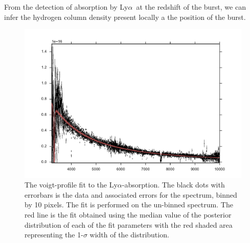 \documentclass[a4paper,fleqn,usenatbib]{mnras}
\newcommand{\lya}{Ly$\alpha$}
\begin{document}
From the detection of absorption by \lya~at the redshift of the burst,
we can infer the hydrogen column density present locally a the
position of the burst. 





\begin{figure} %
	\includegraphics[width=\columnwidth]{figures/DLA_fit.pdf} \caption{The
		voigt-profile fit to the \lya-absorption. The black dots with errorbars is the
		data and associated errors for the spectrum, binned by 10 pixels. The fit is
		performed on the un-binned spectrum. The red line is the fit obtained using the
		median value of the posterior distribution of each of the fit parameters with
		the red shaded area representing the 1-$\sigma$ width of the distribution.}
	\label{fig:example_figure} \end{figure}
\end{document}
